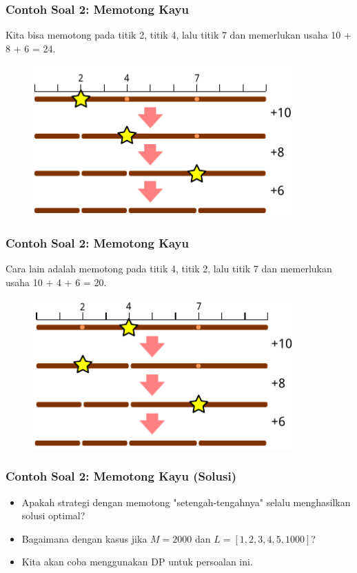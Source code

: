 \begin{frame}
\frametitle{Contoh Soal 2: Memotong Kayu}
Kita bisa memotong pada titik 2, titik 4, lalu titik 7 dan memerlukan usaha 10 + 8 + 6 = 24.
\begin{figure}
  \includegraphics[width=10cm]{asset/cutting-stick-2.pdf}
\end{figure}
\end{frame}

\begin{frame}
\frametitle{Contoh Soal 2: Memotong Kayu}
Cara lain adalah memotong pada titik 4, titik 2, lalu titik 7 dan memerlukan usaha 10 + 4 + 6 = 20.
\begin{figure}
  \includegraphics[width=10cm]{asset/cutting-stick-3.pdf}
\end{figure}
\end{frame}

\begin{frame}
\frametitle{Contoh Soal 2: Memotong Kayu (Solusi)}
\begin{itemize}
  \item Apakah strategi \fGreedy dengan memotong "setengah-tengahnya" selalu menghasilkan solusi optimal?
  \item Bagaimana dengan kasus jika $M = 2000$ dan $L = [1, 2, 3, 4, 5, 1000]$?
  \item Kita akan coba menggunakan DP untuk persoalan ini.
\end{itemize}
\end{frame}

